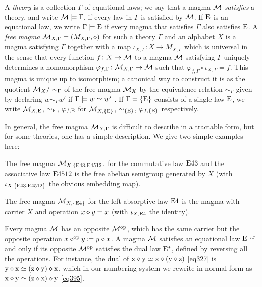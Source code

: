 A \emph{theory} is a collection $\Gamma$ of equational laws; we say that a magma ${\mathcal{M}}$ \emph{satisfies} a theory, and write ${\mathcal{M}} \models \Gamma$, if every law in $\Gamma$ is satisfied by ${\mathcal{M}}$.  If $\mathrm{E}$ is an equational law, we write $\Gamma \models \mathrm{E}$ if every magma that satisfies $\Gamma$ also satisfies $\mathrm{E}$.  A \emph{free magma} ${\mathcal{M}}_{X,\Gamma} = (M_{X,\Gamma},\diamond)$ for such a theory $\Gamma$ and an alphabet $X$ is a magma satisfying $\Gamma$ together with a map $\iota_{X,\Gamma} \colon X \to M_{X,\Gamma}$ which is universal in the sense that every function $f \colon X \to {\mathcal{M}}$ to a magma ${\mathcal{M}}$ satisfying $\Gamma$ uniquely determines a homomorphism $\varphi_{f,\Gamma} \colon {\mathcal{M}}_{X,\Gamma} \to {\mathcal{M}}$ such that $\varphi_{f,\Gamma} \circ \iota_{X,\Gamma} = f$.  This magma is unique up to isomorphism; a canonical way to construct it is as the quotient ${\mathcal{M}}_X/\sim_\Gamma$ of the free magma ${\mathcal{M}}_X$ by the equivalence relation $\sim_\Gamma$ given by declaring $w \sim_\Gamma w'$ if $\Gamma \models w \simeq w'$ \cite[Theorem 3.5.6]{term-rewriting}.  If $\Gamma = \{\mathrm{E}\}$ consists of a single law $\mathrm{E}$, we write ${\mathcal{M}}_{X,\mathrm{E}}$, $\sim_{\mathrm{E}}$, $\varphi_{f,\mathrm{E}}$ for ${\mathcal{M}}_{X,\{\mathrm{E}\}}$, $\sim_{\{\mathrm{E}\}}$, $\varphi_{f,\{\mathrm{E}\}}$ respectively.

In general, the free magma ${\mathcal{M}}_{X,\Gamma}$ is difficult to describe in a tractable form, but for some theories, one has a simple description.  We give two simple examples here:

\begin{example}\label{semi-group} The free magma ${\mathcal{M}}_{X,\{\mathrm{E}43, \mathrm{E}4512\}}$ for the commutative law $\mathrm{E}43$ and the associative law $\mathrm{E}4512$ is the free abelian semigroup generated by $X$ (with $\iota_{X,\{\mathrm{E}43,\mathrm{E}4512\}}$ the obvious embedding map).
\end{example}

\begin{example}\label{left-absorb}
The free magma ${\mathcal{M}}_{X,\{\mathrm{E}4\}}$ for the left-absorptive law $\mathrm{E}4$ is the magma with carrier $X$ and operation $x \diamond y = x$ (with $\iota_{X,\mathrm{E}4}$ the identity).
\end{example}


Every magma ${\mathcal{M}}$ has an opposite ${\mathcal{M}}^{\mathrm{op}}$, which has the same carrier but the opposite operation $x \diamond^{\mathrm{op}} y \coloneqq y \diamond x$.  A magma ${\mathcal{M}}$ satisfies an equational law $\mathrm{E}$ if and only if its opposite ${\mathcal{M}}^{\mathrm{op}}$ satisfies the dual law $\mathrm{E}^*$, defined by reversing all the operations.  For instance, the dual of
$\mathrm{x} \diamond \mathrm{y} \simeq \mathrm{x} \diamond (\mathrm{y} \diamond \mathrm{z})$ \eqref{eq327} is $\mathrm{y} \diamond \mathrm{x} \simeq (\mathrm{z} \diamond \mathrm{y}) \diamond \mathrm{x}$, which in our numbering system we rewrite in normal form as $\mathrm{x} \diamond \mathrm{y} \simeq (\mathrm{z} \diamond \mathrm{x}) \diamond \mathrm{y}$ \eqref{eq395}.

